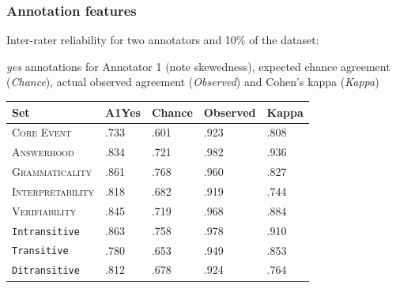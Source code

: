 \documentclass[xcolor={dvipsnames}]{beamer}
\newcommand{\feat}[1]{\textsc{#1}}
\newcommand{\param}[1]{\texttt{#1}}
\begin{document}


\begin{frame}
\frametitle{Annotation features}

\normalsize
\pause
Inter-rater reliability for two annotators and 10\% of the dataset:
\pause

\textit{yes} annotations for Annotator 1 (note skewedness), expected chance agreement (\textit{Chance}), actual observed agreement (\textit{Observed}) and Cohen's kappa (\textit{Kappa})

\begin{table}[htb!]
\begin{center}
\begin{tabular}{|l|l||l|l||l|}
\hline
Set	& A1Yes & Chance & Observed & Kappa \\
\hline
\hline
\feat{Core Event} & .733 & .601 & .923 & .808 \\
\hline
\feat{Answerhood} & .834 & .721 & .982 & .936 \\
\hline
\feat{Grammaticality} & .861 & .768 & .960 & .827 \\
\hline
\feat{Interpretability} & .818 & .682 & .919 & .744 \\
\hline
\feat{Verifiability} & .845 & .719 & .968 & .884 \\
\hline
\hline
\param{Intransitive} & .863 & .758 & .978 & .910 \\
\hline
\param{Transitive} & .780 & .653 & .949 & .853 \\
\hline
\param{Ditransitive} & .812 & .678 & .924 & .764 \\ 
\hline
\end{tabular}
\end{center}
\end{table}
\end{frame}

\end{document}
